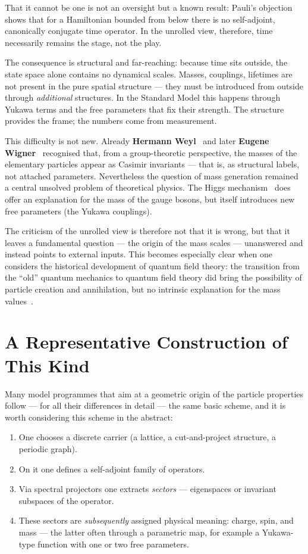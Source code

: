 \documentclass[11pt,a4paper]{article}
\begin{document}
That it cannot be one is not an oversight but a known result: Pauli's objection~\cite{Pauli1933} shows that for a Hamiltonian bounded from below there is no self-adjoint, canonically conjugate time operator. In the unrolled view, therefore, time necessarily remains the stage, not the play.

The consequence is structural and far-reaching: because time sits outside, the state space alone contains no dynamical scales. Masses, couplings, lifetimes are not present in the pure spatial structure --- they must be introduced from outside through \emph{additional} structures. In the Standard Model this happens through Yukawa terms and the free parameters that fix their strength. The structure provides the frame; the numbers come from measurement.

This difficulty is not new. Already \textbf{Hermann Weyl}~\cite{Weyl1928} and later \textbf{Eugene Wigner}~\cite{Wigner1939} recognised that, from a group-theoretic perspective, the masses of the elementary particles appear as Casimir invariants --- that is, as structural labels, not attached parameters. Nevertheless the question of mass generation remained a central unsolved problem of theoretical physics. The Higgs mechanism~\cite{Higgs1964,Englert1964} does offer an explanation for the mass of the gauge bosons, but itself introduces new free parameters (the Yukawa couplings).

The criticism of the unrolled view is therefore not that it is wrong, but that it leaves a fundamental question --- the origin of the mass scales --- unanswered and instead points to external inputs. This becomes especially clear when one considers the historical development of quantum field theory: the transition from the ``old'' quantum mechanics to quantum field theory did bring the possibility of particle creation and annihilation, but no intrinsic explanation for the mass values~\cite{Weinberg1995}.

\section{A Representative Construction of This Kind}

Many model programmes that aim at a geometric origin of the particle properties follow --- for all their differences in detail --- the same basic scheme, and it is worth considering this scheme in the abstract:

\begin{enumerate}[leftmargin=1.6em,itemsep=0.2em]
 \item One chooses a discrete carrier (a lattice, a cut-and-project structure, a periodic graph).
 \item On it one defines a self-adjoint family of operators.
 \item Via spectral projectors one extracts \emph{sectors} --- eigenspaces or invariant subspaces of the operator.
 \item These sectors are \emph{subsequently} assigned physical meaning: charge, spin, and mass --- the latter often through a parametric map, for example a Yukawa-type function with one or two free parameters.
\end{enumerate}
\end{document}
